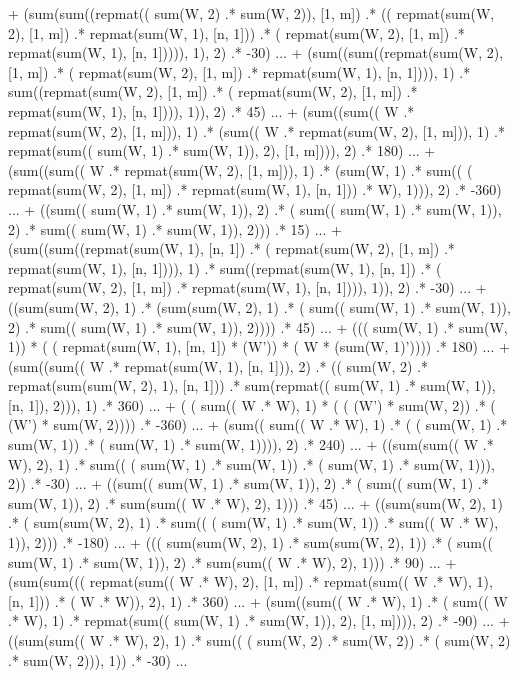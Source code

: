 \documentclass{article}
\begin{document}
  + (sum(sum((repmat(( sum(W, 2) .* sum(W, 2)), [1, m])  .* (( repmat(sum(W, 2), [1, m]) .* repmat(sum(W, 1), [n, 1]))  .* ( repmat(sum(W, 2), [1, m]) .* repmat(sum(W, 1), [n, 1])))), 1), 2)  .* -30) ...
  + (sum((sum((repmat(sum(W, 2), [1, m])  .* ( repmat(sum(W, 2), [1, m]) .* repmat(sum(W, 1), [n, 1]))), 1)  .* sum((repmat(sum(W, 2), [1, m])  .* ( repmat(sum(W, 2), [1, m]) .* repmat(sum(W, 1), [n, 1]))), 1)), 2)  .* 45) ...
  + (sum((sum(( W .* repmat(sum(W, 2), [1, m])), 1)  .* (sum(( W .* repmat(sum(W, 2), [1, m])), 1)  .* repmat(sum(( sum(W, 1) .* sum(W, 1)), 2), [1, m]))), 2)  .* 180) ...
  + (sum((sum(( W .* repmat(sum(W, 2), [1, m])), 1)  .* (sum(W, 1)  .* sum(( ( repmat(sum(W, 2), [1, m]) .* repmat(sum(W, 1), [n, 1])) .* W), 1))), 2)  .* -360) ...
  + ((sum(( sum(W, 1) .* sum(W, 1)), 2)  .* ( sum(( sum(W, 1) .* sum(W, 1)), 2) .* sum(( sum(W, 1) .* sum(W, 1)), 2)))  .* 15) ...
  + (sum((sum((repmat(sum(W, 1), [n, 1])  .* ( repmat(sum(W, 2), [1, m]) .* repmat(sum(W, 1), [n, 1]))), 1)  .* sum((repmat(sum(W, 1), [n, 1])  .* ( repmat(sum(W, 2), [1, m]) .* repmat(sum(W, 1), [n, 1]))), 1)), 2)  .* -30) ...
  + ((sum(sum(W, 2), 1)  .* (sum(sum(W, 2), 1)  .* ( sum(( sum(W, 1) .* sum(W, 1)), 2) .* sum(( sum(W, 1) .* sum(W, 1)), 2))))  .* 45) ...
  + ((( sum(W, 1) .* sum(W, 1))  * ( ( repmat(sum(W, 1), [m, 1]) * (W')) * ( W * (sum(W, 1)'))))  .* 180) ...
  + (sum((sum(( W .* repmat(sum(W, 1), [n, 1])), 2)  .* (( sum(W, 2) .* repmat(sum(sum(W, 2), 1), [n, 1]))  .* sum(repmat(( sum(W, 1) .* sum(W, 1)), [n, 1]), 2))), 1)  .* 360) ...
  + ( ( sum(( W .* W), 1) * ( ( (W') * sum(W, 2)) .* ( (W') * sum(W, 2)))) .* -360) ...
  + (sum(( sum(( W .* W), 1) .* ( ( sum(W, 1) .* sum(W, 1)) .* ( sum(W, 1) .* sum(W, 1)))), 2)  .* 240) ...
  + ((sum(sum(( W .* W), 2), 1)  .* sum(( ( sum(W, 1) .* sum(W, 1)) .* ( sum(W, 1) .* sum(W, 1))), 2))  .* -30) ...
  + ((sum(( sum(W, 1) .* sum(W, 1)), 2)  .* ( sum(( sum(W, 1) .* sum(W, 1)), 2) .* sum(sum(( W .* W), 2), 1)))  .* 45) ...
  + ((sum(sum(W, 2), 1)  .* ( sum(sum(W, 2), 1) .* sum(( ( sum(W, 1) .* sum(W, 1)) .* sum(( W .* W), 1)), 2)))  .* -180) ...
  + ((( sum(sum(W, 2), 1) .* sum(sum(W, 2), 1))  .* ( sum(( sum(W, 1) .* sum(W, 1)), 2) .* sum(sum(( W .* W), 2), 1)))  .* 90) ...
  + (sum(sum((( repmat(sum(( W .* W), 2), [1, m]) .* repmat(sum(( W .* W), 1), [n, 1]))  .* ( W .* W)), 2), 1)  .* 360) ...
  + (sum((sum(( W .* W), 1)  .* ( sum(( W .* W), 1) .* repmat(sum(( sum(W, 1) .* sum(W, 1)), 2), [1, m]))), 2)  .* -90) ...
  + ((sum(sum(( W .* W), 2), 1)  .* sum(( ( sum(W, 2) .* sum(W, 2)) .* ( sum(W, 2) .* sum(W, 2))), 1))  .* -30) ...
\end{document}
